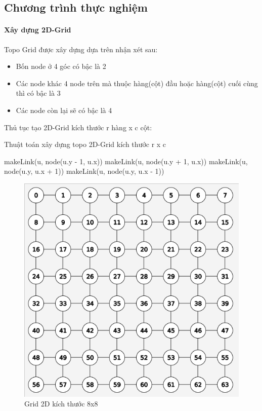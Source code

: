 \documentclass[../report.tex]{subfiles}
\begin{document}
\subsection{Chương trình thực nghiệm}
\paragraph*{Xây dựng 2D-Grid}
Topo Grid được xây dựng dựa trên nhận xét sau:
\begin{itemize}
        \item Bốn node ở 4 góc có bậc là 2
        \item Các node khác 4 node trên mà thuộc hàng(cột) đầu hoặc hàng(cột) cuối cùng thì có bậc là 3
        \item Các node còn lại sẽ có bậc là 4
\end{itemize}

Thủ tục tạo 2D-Grid kích thước r hàng x c cột:
\begin{algorithm}[H]
		\caption{Thuật toán xây dựng topo 2D-Grid kích thước r x c}
		\begin{algorithmic}[1]
            \State makeLink(u, node(u.y - 1, u.x))
            \EndIf
            \State makeLink(u, node(u.y + 1, u.x))
            \EndIf
            \State makeLink(u, node(u.y, u.x + 1))
            \EndIf
            \State makeLink(u, node(u.y, u.x - 1))
            \EndIf
			\EndFor
			\EndProcedure
		\end{algorithmic}
\end{algorithm}
\begin{figure}[H]
    \centering
    \includegraphics[scale=0.41]{figures/grid.png}
    \caption {Grid 2D kích thước 8x8}
\end{figure}
\end{document}
